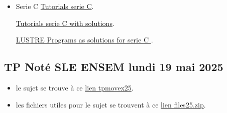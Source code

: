 \documentclass[ 12pt]{article}
\begin{document}
\begin{itemize}
  
  \item[]   Serie  C
    \href{http://mery54.github.io/teaching/movex/lecturesnotes/movexserieCC.pdf}{Tutorials 
      serie C}.

          \href{http://mery54.github.io/teaching/movex/lecturesnotes/correctionmovexserieC.pdf}{Tutorials 
      serie C with solutions}. 

    
        \href{http://mery54.github.io/teaching/movex/models/serieC.zip}{LUSTRE
          Programs as  solutions for serie C }.

    \end{itemize}

     


\subsection{TP Noté  SLE ENSEM lundi 19 mai 2025 }
\label{sec:tp-note-sle}

\begin{itemize}
\item le sujet se trouve  à ce
  \href{http://mery54.github.io/teaching/movex/lecturesnotes/tpmovex2025.pdf}{lien
   tpmovex25}. 

\item les fichiers utiles pour le sujet se trouvent   à ce
  \href{http://mery54.github.io/teaching/movex/lecturesnotes/files25.zip}{lien
  files25.zip}. 
\end{itemize}


 

\end{document}
